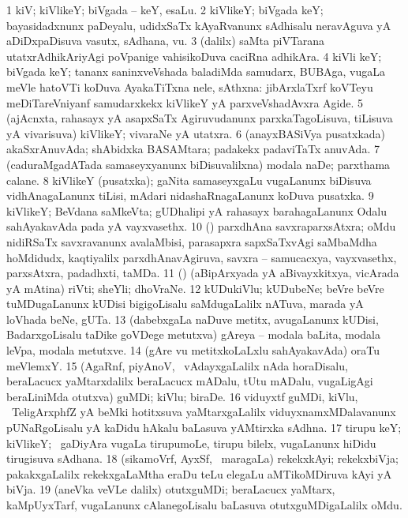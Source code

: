 \bentry
{}
\gl{\nA}
\bmng
\bnum
\num{1} kiV; kiVlikeY; biVgada -- keY, esaLu. 
\num{2} kiVlikeY; biVgada keY; bayasidadxnunx paDeyalu, udidxSaTx kAyaRvanunx sAdhisalu neravAguva yA aDiDxpaDisuva vasutx, sAdhana, \mo vu. 
\hypertarget{key(1)3}{} 
\num{3} (\bava dalilx) saMta piVTarana utatxrAdhikAriyAgi poVpanige vahisikoDuva caciRna adhikAra. 
\num{4} kiVli keY; biVgada keY; tananx saninxveVshada baladiMda samudarx, BUBAga, \mo vugaLa meVle hatoVTi koDuva AyakaTiTxna nele, sAthxna:  jibArxlaTxrf koVTeyu meDiTareVniyanf samudarxkekx kiVlikeY yA parxveVshadAvxra Agide. 
\num{5} (ajAcnxta, rahasayx yA asapxSaTx Agiruvudanunx parxkaTagoLisuva, tiLisuva yA vivarisuva) kiVlikeY; vivaraNe yA utatxra. 
\num{6} (anayxBASiVya pusatxkada) akaSxrAnuvAda; shAbidxka BASAMtara; padakekx padaviTaTx anuvAda. 
\hypertarget{key(1)7}{} 
\num{7} (caduraMgadATada samaseyxyanunx biDisuvalilxna) modala naDe; parxthama calane. 
\num{8} kiVlikeY (pusatxka); gaNita samaseyxgaLu \mo vugaLanunx biDisuva vidhAnagaLanunx tiLisi, mAdari nidashaRnagaLanunx koDuva pusatxka. 
\num{9} kiVlikeY; BeVdana saMkeVta; gUDhalipi yA rahasayx barahagaLanunx Odalu sahAyakavAda pada yA vayxvasethx. 
\num{10} (\saM) parxdhAna savxraparxsAtxra; oMdu nidiRSaTx savxravanunx avalaMbisi, parasapxra sapxSaTxvAgi saMbaMdha hoMdidudx, kaqtiyalilx parxdhAnavAgiruva, savxra -- samucacxya, vayxvasethx, parxsAtxra, padadhxti, taMDa. 
\num{11} (\rUpa) (aBipArxyada yA aBivayxkitxya, vicArada yA mAtina) riVti; sheYli; dhoVraNe. 
\num{12} kUDukiVlu; kUDubeNe; beVre beVre tuMDugaLanunx kUDisi bigigoLisalu saMdugaLalilx nATuva, marada yA loVhada beNe, gUTa. 
\num{13} (dabebxgaLa naDuve metitx, avugaLanunx kUDisi, BadarxgoLisalu taDike goVDege metutxva) gAreya -- modala baLita, modala leVpa, modala metutxve. 
\num{14} (gAre \mo vu metitxkoLaLxlu sahAyakavAda) oraTu meVlemxY. 
\num{15} (AgaRnf, piyAnoV, \mo\ vAdayxgaLalilx nAda horaDisalu, beraLacucx yaMtarxdalilx beraLacucx mADalu, tUtu mADalu, \mo vugaLigAgi beraLiniMda otutxva) guMDi; kiVlu; biraDe. 
\num{16} viduyxtf guMDi, kiVlu, \udA\ TeligArxphfZ yA beMki hotitxsuva yaMtarxgaLalilx viduyxnamxMDalavanunx pUNaRgoLisalu yA kaDidu hAkalu baLasuva yAMtirxka sAdhna. 
\num{17} tirupu keY; kiVlikeY; \kanmu\ gaDiyAra \mo vugaLa tirupumoLe, tirupu bilelx, \mo vugaLanunx hiDidu tirugisuva sAdhana. 
\num{18} (sikamoVrf, AyxSf, \mo\ maragaLa) rekekxkAyi; rekekxbiVja; pakakxgaLalilx rekekxgaLaMtha eraDu teLu elegaLu aMTikoMDiruva kAyi yA biVja. 
\num{19} (aneVka veVLe \bava dalilx) otutxguMDi; beraLacucx yaMtarx, kaMpUyxTarf, \mo vugaLanunx cAlanegoLisalu baLasuva otutxguMDigaLalilx oMdu. 
\enum
\emng

